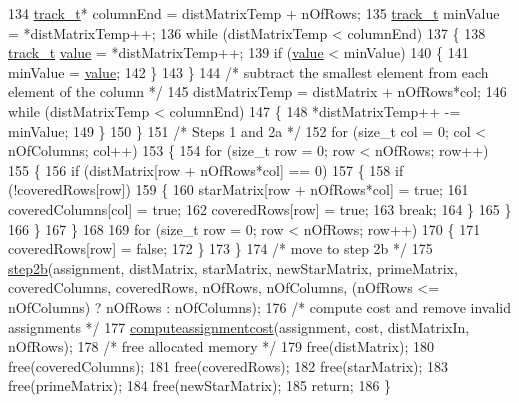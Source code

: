 \begin{DoxyCode}
134             \mbox{\hyperlink{defines_8h_a7ce9c8817b42ab418e61756f579549ab}{track\_t}}* columnEnd = distMatrixTemp + nOfRows;
135             \mbox{\hyperlink{defines_8h_a7ce9c8817b42ab418e61756f579549ab}{track\_t}}  minValue = *distMatrixTemp++;
136             \textcolor{keywordflow}{while} (distMatrixTemp < columnEnd)
137             \{
138                 \mbox{\hyperlink{defines_8h_a7ce9c8817b42ab418e61756f579549ab}{track\_t}} \mbox{\hyperlink{struct_g_m_l__token_a50b20988e3fe419332313e8d9e02c775}{value}} = *distMatrixTemp++;
139                 \textcolor{keywordflow}{if} (\mbox{\hyperlink{struct_g_m_l__token_a50b20988e3fe419332313e8d9e02c775}{value}} < minValue)
140                 \{
141                     minValue = \mbox{\hyperlink{struct_g_m_l__token_a50b20988e3fe419332313e8d9e02c775}{value}};
142                 \}
143             \}
144             \textcolor{comment}{/* subtract the smallest element from each element of the column */}
145             distMatrixTemp = distMatrix + nOfRows*col;
146             \textcolor{keywordflow}{while} (distMatrixTemp < columnEnd)
147             \{
148                 *distMatrixTemp++ -= minValue;
149             \}
150         \}
151         \textcolor{comment}{/* Steps 1 and 2a */}
152         \textcolor{keywordflow}{for} (\textcolor{keywordtype}{size\_t} col = 0; col < nOfColumns; col++)
153         \{
154             \textcolor{keywordflow}{for} (\textcolor{keywordtype}{size\_t} row = 0; row < nOfRows; row++)
155             \{
156                 \textcolor{keywordflow}{if} (distMatrix[row + nOfRows*col] == 0)
157                 \{
158                     \textcolor{keywordflow}{if} (!coveredRows[row])
159                     \{
160                         starMatrix[row + nOfRows*col] = \textcolor{keyword}{true};
161                         coveredColumns[col] = \textcolor{keyword}{true};
162                         coveredRows[row] = \textcolor{keyword}{true};
163                         \textcolor{keywordflow}{break};
164                     \}
165                 \}
166             \}
167         \}
168 
169         \textcolor{keywordflow}{for} (\textcolor{keywordtype}{size\_t} row = 0; row < nOfRows; row++)
170         \{
171             coveredRows[row] = \textcolor{keyword}{false};
172         \}
173     \}
174     \textcolor{comment}{/* move to step 2b */}
175     \mbox{\hyperlink{class_assignment_problem_solver_a069b78d89842031f7b54e0837c2bd602}{step2b}}(assignment, distMatrix, starMatrix, newStarMatrix, primeMatrix, coveredColumns, 
      coveredRows, nOfRows, nOfColumns, (nOfRows <= nOfColumns) ? nOfRows : nOfColumns);
176     \textcolor{comment}{/* compute cost and remove invalid assignments */}
177     \mbox{\hyperlink{class_assignment_problem_solver_a978fa51f563d47dbd00c697704cf4ad9}{computeassignmentcost}}(assignment, cost, distMatrixIn, nOfRows);
178     \textcolor{comment}{/* free allocated memory */}
179     free(distMatrix);
180     free(coveredColumns);
181     free(coveredRows);
182     free(starMatrix);
183     free(primeMatrix);
184     free(newStarMatrix);
185     \textcolor{keywordflow}{return};
186 \}
\end{DoxyCode}
